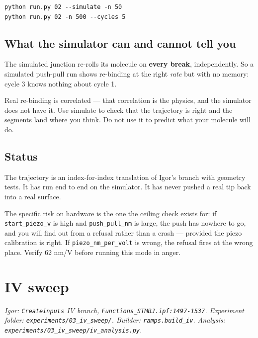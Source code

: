 \begin{lstlisting}[style=out]
python run.py 02 --simulate -n 50
python run.py 02 -n 500 --cycles 5
\end{lstlisting}

\section{What the simulator can and cannot tell you}

The simulated junction re-rolls its molecule on \textbf{every break}, independently. So a simulated push-pull run shows re-binding at the right \emph{rate} but with no memory: cycle 3 knows nothing about cycle 1.

Real re-binding is correlated --- that correlation is the physics, and the simulator does not have it. Use simulate to check that the trajectory is right and the segments land where you think. Do not use it to predict what your molecule will do.

\section{Status}

The trajectory is an index-for-index translation of Igor's branch with geometry tests. It has run end to end on the simulator. It has never pushed a real tip back into a real surface.

The specific risk on hardware is the one the ceiling check exists for: if \texttt{start\_\discretionary{}{}{}piezo\_\discretionary{}{}{}v} is high and \texttt{push\_\discretionary{}{}{}pull\_\discretionary{}{}{}nm} is large, the push has nowhere to go, and you will find out from a refusal rather than a crash --- provided the piezo calibration is right. If \texttt{piezo\_\discretionary{}{}{}nm\_\discretionary{}{}{}per\_\discretionary{}{}{}volt} is wrong, the refusal fires at the wrong place. Verify 62 nm/V before running this mode in anger.

\setcounter{chapter}{11}
\chapter{IV sweep}

\emph{Igor: \texttt{Create\discretionary{}{}{}Inputs} IV branch, \texttt{Functions\_\discretionary{}{}{}STMBJ.\discretionary{}{}{}ipf:1497-1537}. Experiment folder: \texttt{experiments/\discretionary{}{}{}03\_\discretionary{}{}{}iv\_\discretionary{}{}{}sweep/\discretionary{}{}{}}. Builder: \texttt{ramps.\discretionary{}{}{}build\_\discretionary{}{}{}iv}. Analysis: \texttt{experiments/\discretionary{}{}{}03\_\discretionary{}{}{}iv\_\discretionary{}{}{}sweep/\discretionary{}{}{}iv\_\discretionary{}{}{}analysis.\discretionary{}{}{}py}.}

